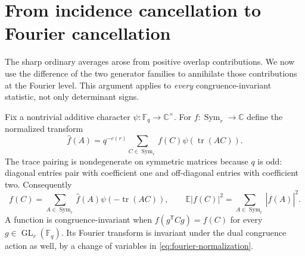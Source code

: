 \documentclass[11pt,a4paper]{article}
\theoremstyle{definition}
\theoremstyle{remark}
\newcommand{\F}{\mathbb F}
\newcommand{\C}{\mathbb C}
\newcommand{\E}{\mathbb E}
\newcommand{\Sym}{\operatorname{Sym}}
\newcommand{\tr}{\operatorname{tr}}
\newcommand{\GL}{\operatorname{GL}}
\begin{document}
\section{From incidence cancellation to Fourier cancellation}
\label{sec:fourier}
The sharp ordinary averages arose from positive overlap contributions.
We now use the difference of the two generator families to annihilate
those contributions at the Fourier level. This argument applies to
\emph{every} congruence-invariant statistic, not only determinant signs.

Fix a nontrivial additive character $\psi:\F_q\to\C^\times$. For
$f:\Sym_r\to\C$ define the normalized transform
\begin{equation}\label{eq:fourier-normalization}
 \widehat f(A)=q^{-c(r)}\sum_{C\in\Sym_r}f(C)\psi(\tr(AC)).
\end{equation}
The trace pairing is nondegenerate on symmetric matrices because $q$ is
odd: diagonal entries pair with coefficient one and off-diagonal entries
with coefficient two. Consequently
\begin{equation}\label{eq:fourier-parseval}
 f(C)=\sum_{A\in\Sym_r}\widehat f(A)\psi(-\tr(AC)),\qquad
 \E|f(C)|^2=\sum_{A\in\Sym_r}|\widehat f(A)|^2.
\end{equation}
A function is congruence-invariant when
$f(g^{\mathsf T}Cg)=f(C)$ for every $g\in\GL_r(\F_q)$.
Its Fourier transform is invariant under the dual congruence action as
well, by a change of variables in \eqref{eq:fourier-normalization}.
\end{document}

